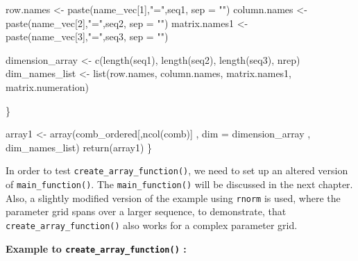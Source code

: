 \documentclass[11pt,a4paper]{article}
\newenvironment{Shaded}{\begin{snugshade}}{\end{snugshade}}
\newcommand{\AttributeTok}[1]{\textcolor[rgb]{0.77,0.63,0.00}{#1}}
\newcommand{\DecValTok}[1]{\textcolor[rgb]{0.00,0.00,0.81}{#1}}
\newcommand{\FunctionTok}[1]{\textcolor[rgb]{0.00,0.00,0.00}{#1}}
\newcommand{\NormalTok}[1]{#1}
\newcommand{\OtherTok}[1]{\textcolor[rgb]{0.56,0.35,0.01}{#1}}
\newcommand{\StringTok}[1]{\textcolor[rgb]{0.31,0.60,0.02}{#1}}
\begin{document}
\begin{Shaded}
\begin{Highlighting}[]
\NormalTok{    row.names }\OtherTok{\textless{}{-}} \FunctionTok{paste}\NormalTok{(name\_vec[}\DecValTok{1}\NormalTok{],}\StringTok{"="}\NormalTok{,seq1, }\AttributeTok{sep =} \StringTok{""}\NormalTok{)}
\NormalTok{    column.names }\OtherTok{\textless{}{-}}  \FunctionTok{paste}\NormalTok{(name\_vec[}\DecValTok{2}\NormalTok{],}\StringTok{"="}\NormalTok{,seq2, }\AttributeTok{sep =} \StringTok{""}\NormalTok{)}
\NormalTok{    matrix.names1 }\OtherTok{\textless{}{-}}  \FunctionTok{paste}\NormalTok{(name\_vec[}\DecValTok{3}\NormalTok{],}\StringTok{"="}\NormalTok{,seq3, }\AttributeTok{sep =} \StringTok{""}\NormalTok{)}
    
\NormalTok{    dimension\_array }\OtherTok{\textless{}{-}} \FunctionTok{c}\NormalTok{(}\FunctionTok{length}\NormalTok{(seq1), }\FunctionTok{length}\NormalTok{(seq2), }\FunctionTok{length}\NormalTok{(seq3), nrep)}
\NormalTok{    dim\_names\_list }\OtherTok{\textless{}{-}} \FunctionTok{list}\NormalTok{(row.names, column.names, }
\NormalTok{                           matrix.names1, matrix.numeration)}
    
\NormalTok{  \}}
  
  
\NormalTok{  array1 }\OtherTok{\textless{}{-}} \FunctionTok{array}\NormalTok{(comb\_ordered[,}\FunctionTok{ncol}\NormalTok{(comb)] }
\NormalTok{                  , }\AttributeTok{dim =}\NormalTok{ dimension\_array}
\NormalTok{                  , dim\_names\_list)}
  \FunctionTok{return}\NormalTok{(array1)}
\NormalTok{\}}
\end{Highlighting}
\end{Shaded}

In order to test \texttt{create\_array\_function()}, we need to set up
an altered version of \texttt{main\_function()}. The
\texttt{main\_function()} will be discussed in the next chapter. Also, a
slightly modified version of the example using \texttt{rnorm} is used,
where the parameter grid spans over a larger sequence, to demonstrate,
that \texttt{create\_array\_function()} also works for a complex
parameter grid.

\textbf{Example to \texttt{create\_array\_function()} :}
\end{document}
